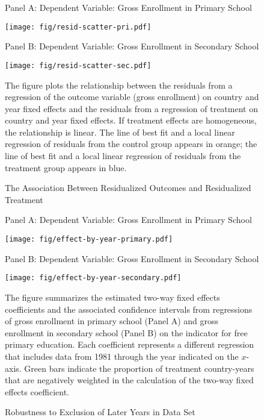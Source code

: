 \documentclass[11pt]{article}
\begin{document}
\begin{figure}
	\begin{center}	
		\caption{The Association Between Residualized Outcomes and Residualized Treatment} \label{fig:residscatter}
		
		\medskip
		
		Panel A:  Dependent Variable:  Gross Enrollment in Primary School
		
		\texttt{[image: fig/resid-scatter-pri.pdf]}
		
		\medskip
		
		Panel B:  Dependent Variable:  Gross Enrollment in Secondary School
		
		\texttt{[image: fig/resid-scatter-sec.pdf]}
		
	\end{center}

\footnotesize{The figure plots the relationship between the residuals from a regression of the outcome variable (gross enrollment) on country and year fixed effects and the residuals from a regression of treatment on country and year fixed effects.  If treatment effects are homogeneous, the relationship is linear.  The line of best fit and a local linear regression of residuals from the control group appears in orange; the line of best fit and a local linear regression of residuals from the treatment group appears in blue.}

\end{figure}


\begin{figure}[h]
	\begin{center}	
		\caption{Robustness to Exclusion of Later Years in Data Set} \label{fig:dropyears}

\medskip		
\medskip

Panel A:  Dependent Variable:  Gross Enrollment in Primary School
		
		\texttt{[image: fig/effect-by-year-primary.pdf]}
		
	\medskip
	
	Panel B:  Dependent Variable:  Gross Enrollment in Secondary School
	
	\texttt{[image: fig/effect-by-year-secondary.pdf]}
		
	\end{center}

\footnotesize{The figure summarizes the estimated two-way fixed effects coefficients and the associated confidence intervals from regressions of gross enrollment in primary school (Panel A) and gross enrollment in secondary school (Panel B) on the indicator for free primary education.  Each coefficient represents a different regression that includes data from 1981 through the year indicated on the $x$-axis.  Green bars indicate the proportion of treatment country-years that are negatively weighted in the calculation of the two-way fixed effects coefficient.}
\end{figure}
\end{document}
